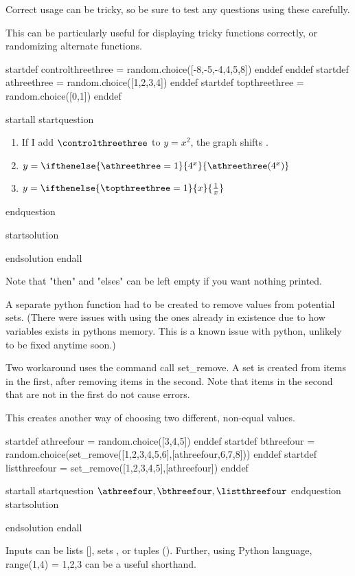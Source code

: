 Correct usage can be tricky, so be sure to test any questions using these carefully.

This can be particularly useful for displaying tricky functions correctly, or randomizing alternate functions.

startdef controlthreethree = random.choice([-8,-5,-4,4,5,8]) enddef enddef
startdef athreethree = random.choice([1,2,3,4]) enddef
startdef topthreethree = random.choice([0,1]) enddef

startall
startquestion \begin{enumerate}
\item If I add $\controlthreethree$ to $y=x^2$, the graph shifts .
\item $y = \ifthenelse{\athreethree = 1}{4^x}{\athreethree(4^x)}$
\item $y = \ifthenelse{\topthreethree = 1}{x}{\frac{1}{x}}$
\end{enumerate}
endquestion

startsolution \item  endsolution
endall

Note that "then" and "elses" can be left empty if you want nothing printed.




A separate python function had to be created to remove values from potential sets. (There were issues with using the ones already in existence due to how variables exists in pythons memory. This is a known issue with python, unlikely to be fixed anytime soon.)

Two workaround uses the command call set_remove. A set is created from items in the first, after removing items in the second. Note that items in the second that are not in the first do not cause errors.

This creates another way of choosing two different, non-equal values.

startdef athreefour = random.choice([3,4,5]) enddef
startdef bthreefour = random.choice(set_remove([1,2,3,4,5,6],[athreefour,6,7,8])) enddef
startdef listthreefour = set_remove([1,2,3,4,5],[athreefour]) enddef

startall
startquestion $\athreefour, \bthreefour, \listthreefour$ endquestion
startsolution \item  endsolution
endall

Inputs can be lists [], sets {}, or tuples (). Further, using Python language, range(1,4) = {1,2,3} can be a useful shorthand.



